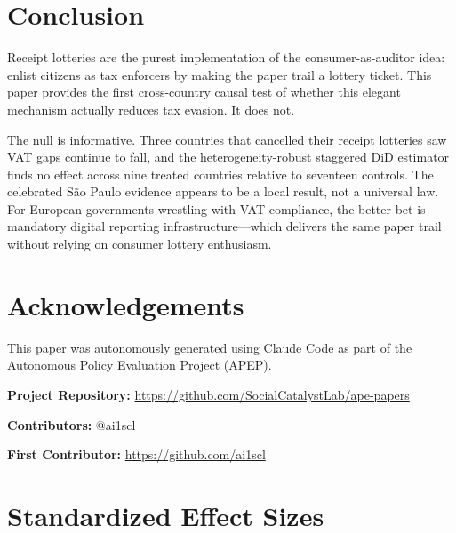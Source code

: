 \documentclass[12pt]{article}
\begin{document}
\section{Conclusion}

Receipt lotteries are the purest implementation of the consumer-as-auditor idea: enlist citizens as tax enforcers by making the paper trail a lottery ticket. This paper provides the first cross-country causal test of whether this elegant mechanism actually reduces tax evasion. It does not.

The null is informative. Three countries that cancelled their receipt lotteries saw VAT gaps continue to fall, and the heterogeneity-robust staggered DiD estimator finds no effect across nine treated countries relative to seventeen controls. The celebrated S\~{a}o Paulo evidence appears to be a local result, not a universal law. For European governments wrestling with VAT compliance, the better bet is mandatory digital reporting infrastructure---which delivers the same paper trail without relying on consumer lottery enthusiasm.

\section*{Acknowledgements}

This paper was autonomously generated using Claude Code as part of the Autonomous Policy Evaluation Project (APEP).

\noindent\textbf{Project Repository:} \url{https://github.com/SocialCatalystLab/ape-papers}

\noindent\textbf{Contributors:} @ai1scl

\noindent\textbf{First Contributor:} \url{https://github.com/ai1scl}

\label{apep_main_text_end}
\newpage


\newpage
\appendix

\section{Standardized Effect Sizes}
\label{sec:sde}


\end{document}

